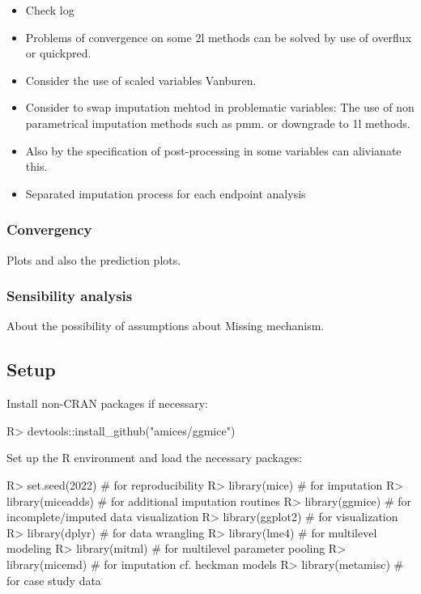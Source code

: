 \documentclass[
]{jss}
\providecommand{\tightlist}{%
  \setlength{\itemsep}{0pt}\setlength{\parskip}{0pt}}
\begin{document}
\begin{itemize}
\tightlist
\item
  Check log
\item
  Problems of convergence on some 2l methods can be solved by use of
  overflux or quickpred.
\item
  Consider the use of scaled variables Vanburen.
\item
  Consider to swap imputation mehtod in problematic variables: The use
  of non parametrical imputation methods such as pmm. or downgrade to 1l
  methods.
\item
  Also by the specification of post-processing in some variables can
  alivianate this.
\item
  Separated imputation process for each endpoint analysis
\end{itemize}

\hypertarget{convergency}{%
\subsubsection{Convergency}\label{convergency}}

Plots and also the prediction plots.

\hypertarget{sensibility-analysis}{%
\subsubsection{Sensibility analysis}\label{sensibility-analysis}}

About the possibility of assumptions about Missing mechanism.

\hypertarget{setup}{%
\subsection{Setup}\label{setup}}

Install non-CRAN packages if necessary:

\begin{CodeChunk}
\begin{CodeInput}
R> devtools::install_github("amices/ggmice")
\end{CodeInput}
\end{CodeChunk}

Set up the R environment and load the necessary packages:

\begin{CodeChunk}
\begin{CodeInput}
R> set.seed(2022)        # for reproducibility
R> library(mice)         # for imputation
R> library(miceadds)     # for additional imputation routines
R> library(ggmice)       # for incomplete/imputed data visualization
R> library(ggplot2)      # for visualization
R> library(dplyr)        # for data wrangling
R> library(lme4)         # for multilevel modeling
R> library(mitml)        # for multilevel parameter pooling
R> library(micemd)  # for imputation cf. heckman models
R> library(metamisc)     # for case study data
\end{CodeInput}
\end{CodeChunk}
\end{document}
